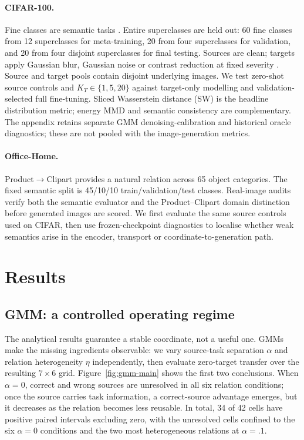 \documentclass{article}
\newcommand{\KT}{K_T}
\begin{document}
\paragraph{CIFAR-100.}
Fine classes are semantic tasks \citep{krizhevsky2009}. Entire superclasses are held out: 60 fine classes from 12 superclasses for meta-training, 20 from four superclasses for validation, and 20 from four disjoint superclasses for final testing. Sources are clean; targets apply Gaussian blur, Gaussian noise or contrast reduction at fixed severity \citep{hendrycks2019}. Source and target pools contain disjoint underlying images. We test zero-shot source controls and $\KT\in\{1,5,20\}$ against target-only modelling and validation-selected full fine-tuning. Sliced Wasserstein distance (SW) is the headline distribution metric; energy MMD and semantic consistency are complementary. The appendix retains separate GMM denoising-calibration and historical oracle diagnostics; these are not pooled with the image-generation metrics.

\paragraph{Office-Home.}
Product$\rightarrow$Clipart provides a natural relation across 65 object categories. The fixed semantic split is 45/10/10 train/validation/test classes. Real-image audits verify both the semantic evaluator and the Product--Clipart domain distinction before generated images are scored. We first evaluate the same source controls used on CIFAR, then use frozen-checkpoint diagnostics to localise whether weak semantics arise in the encoder, transport or coordinate-to-generation path.

\section{Results}
\label{sec:results}
\subsection{GMM: a controlled operating regime}
\label{sec:gmm}
The analytical results guarantee a stable coordinate, not a useful one. GMMs make the missing ingredients observable: we vary source-task separation $\alpha$ and relation heterogeneity $\eta$ independently, then evaluate zero-target transfer over the resulting $7\times6$ grid. Figure~\ref{fig:gmm-main} shows the first two conclusions. When $\alpha=0$, correct and wrong sources are unresolved in all six relation conditions; once the source carries task information, a correct-source advantage emerges, but it decreases as the relation becomes less reusable. In total, 34 of 42 cells have positive paired intervals excluding zero, with the unresolved cells confined to the six $\alpha=0$ conditions and the two most heterogeneous relations at $\alpha=.1$.
\end{document}

